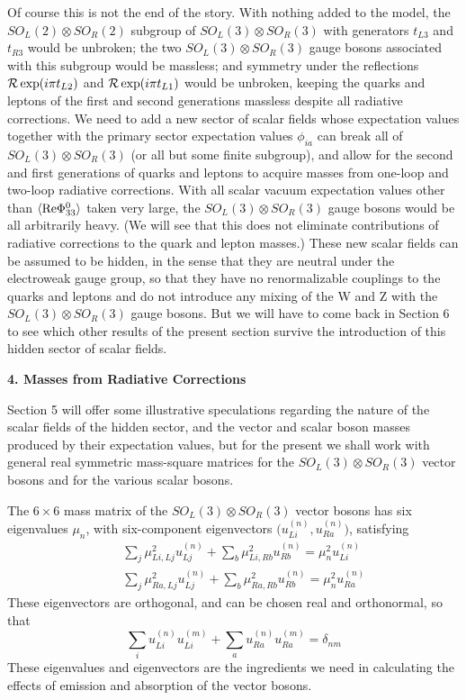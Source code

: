 \documentclass[12pt]{article}
\begin{document}
Of course this is not the end of the story.  With nothing added to the model,  the  $SO_L(2)\otimes  SO_R(2)$ subgroup of $SO_L(3)\otimes  SO_R(3)$ with generators $t_{L3}$ and $t_{R3}$ would be unbroken; the two $SO_L(3)\otimes  SO_R(3)$ gauge bosons associated with this subgroup would be massless;  and symmetry under the reflections ${\cal R}\exp(i\pi t_{L2})$ and ${\cal R}\exp(i\pi t_{L1})$ would be unbroken, keeping the quarks and leptons of the first and second generations massless despite all radiative corrections.  We need to add a new sector of  scalar fields whose expectation values together with the primary sector expectation values $\phi_{ia}$ can break all of $SO_L(3)\otimes  SO_R(3)$ (or all but some finite subgroup), and allow for the  second and first generations of quarks and leptons to acquire  masses from one-loop and two-loop  radiative corrections.  With all scalar vacuum expectation values other than $\langle{\rm Re}\Phi^0_{33}\rangle$ taken very large, the $SO_L(3)\otimes  SO_R(3)$ gauge bosons would be all arbitrarily heavy.
(We will see that this does not eliminate contributions of radiative corrections to the quark and lepton masses.)  These new  scalar fields can be assumed to be hidden, in the sense that they are neutral under the electroweak gauge group, so that they have no renormalizable couplings to the quarks and leptons and do not introduce any mixing of the W  and Z with the $SO_L(3)\otimes  SO_R(3)$ gauge bosons.  But we will have to come back in Section 6 to see which other results of the present section survive the introduction of this hidden sector of scalar fields.




\begin{center}
{\bf 4.  Masses from Radiative Corrections}
\end{center}

  
Section 5 will offer some illustrative speculations regarding the nature of the scalar fields of the hidden sector, and the vector and scalar boson masses produced by their expectation values, but for the present we shall work with  general real symmetric mass-square  matrices for the $SO_L(3)\otimes  SO_R(3)$ vector bosons and for the various scalar bosons.   

The $6\times 6$ mass matrix of the $SO_L(3)\otimes  SO_R(3)$ vector bosons has six eigenvalues $\mu_n$, with six-component eigenvectors $\Big(u^{(n)}_{Li},u^{(n)}_{Ra}\Big)$, satisfying
\begin{eqnarray} 
&&\sum_j \mu^2_{Li,Lj}u^{(n)}_{Lj}+\sum_b \mu^2_{Li,Rb}u^{(n)}_{Rb}=\mu_n^2 u^{(n)}_{Li}\nonumber\\&&
\sum_j \mu^2_{Ra,Lj}u^{(n)}_{Lj}+\sum_b \mu^2_{Ra,Rb}u^{(n)}_{Rb}=\mu_n^2 u^{(n)}_{Ra}
\end{eqnarray}
These eigenvectors are orthogonal, and can be chosen real and orthonormal, so that
\begin{equation}
 \sum_i u^{(n)}_{Li}u^{(m)}_{Li}+\sum_a u^{(n)}_{Ra}u^{(m)}_{Ra}=\delta_{nm}
\end{equation}
These eigenvalues and eigenvectors are the ingredients we need in calculating the effects of emission and absorption of the vector bosons.
\end{document}
